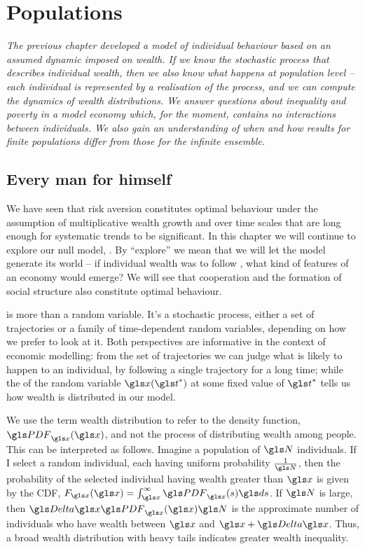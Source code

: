 \newpage


\section{Populations}
{\it 
The previous chapter developed a model of individual behaviour based on an
assumed dynamic imposed on wealth. If we know the stochastic process that describes
individual wealth, then we also know what happens at population level -- each individual
is represented by a realisation of the process, and we can compute 
the dynamics of wealth distributions. We answer questions about inequality and poverty in
a model economy which, for the moment, contains no interactions between individuals. We also gain an understanding of when and how results for finite populations differ from those for the infinite ensemble.}
\newpage


\subsection{Every man for himself}

We have seen that risk aversion constitutes optimal behaviour under the assumption 
of multiplicative wealth growth and over time scales that are long enough for systematic 
trends to be significant. In this chapter we will continue to explore our null model, 
\GBM. By ``explore'' we mean that we will let the model generate its world -- if 
individual wealth was to follow \GBM, what kind of features of an economy would emerge? 
We will see that cooperation and the formation of social structure also constitute 
optimal behaviour.

\GBM is more than a random variable. It's a stochastic process, either a set of trajectories 
or a family of time-dependent random variables, depending on how we 
prefer to look at it.  Both perspectives are informative in the context of economic modelling:
from the set of trajectories we can judge what is likely to happen to an individual, 
\eg by following a single trajectory for a long time; while the \PDFa of the random 
variable $\x(\t^*)$ at some fixed value of $\t^*$ tells us how wealth is distributed in our model. 

We use the term wealth distribution to refer to the density function, $\PDF_\x(\x)$, and not the process of distributing wealth among people. This can be interpreted as follows. Imagine a population of $\N$ individuals. If I select a random individual, each having uniform probability $\frac{1}{\N}$, then the probability of the selected individual having wealth greater than $\x$ is given by the CDF, $F_\x(\x)=\int_\x^\infty \PDF_\x(s)\gd s$. If $\N$ is large, then $\D \x \PDF_\x(\x)\N$ is the approximate number of individuals who have wealth between $\x$ and $\x+\D \x$. Thus, a broad wealth distribution with heavy tails indicates greater wealth inequality.

